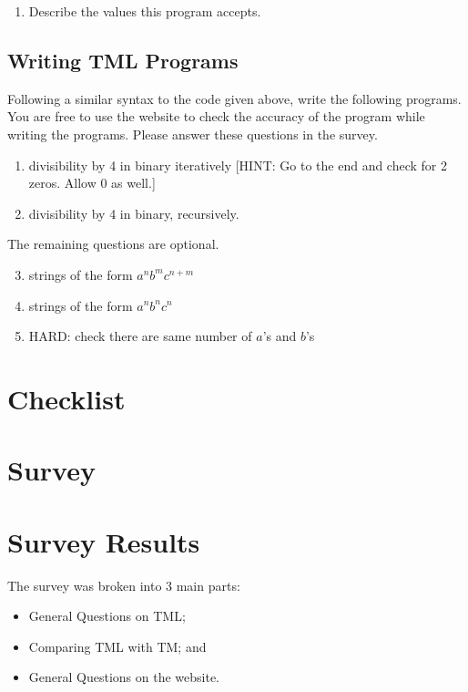 \begin{appendices}
\begin{enumerate}
\begin{enumerate}
        \item Describe the values this program accepts.
    \end{enumerate}
\end{enumerate}
\newpage

\subsection{Writing TML Programs}

Following a similar syntax to the code given above, write the following programs. You are free to use the website to check the accuracy of the program while writing the programs. Please answer these questions in the survey.
\begin{enumerate}
    \item divisibility by 4 in binary iteratively [HINT: Go to the end and check for 2 zeros. Allow 0 as well.]
    \item divisibility by 4 in binary, recursively.
\end{enumerate}
    
The remaining questions are optional. 
\begin{enumerate}
    \setcounter{enumi}{2}
    \item strings of the form $a^n b^m c^{n+m}$
    \item strings of the form $a^n b^n c^n$
    \item HARD: check there are same number of $a$'s and $b$'s
\end{enumerate}

\section{Checklist}
\section{Survey}



\section{Survey Results}
The survey was broken into 3 main parts:
\begin{itemize}
    \item General Questions on TML;
    \item Comparing TML with TM; and
    \item General Questions on the website.
\end{itemize}


\end{appendices}
